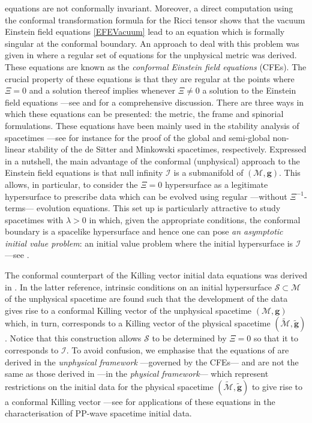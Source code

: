 \documentclass[10pt,a4paper]{article}
\theoremstyle{plain}
\def\bmg{{\bm g}}
\begin{document}
equations are not conformally invariant. Moreover, a direct
computation using the conformal transformation formula for the Ricci
tensor shows that the vacuum Einstein field equations
\eqref{EFEVacuum} lead to an equation which is formally singular at
the conformal boundary.  An approach to deal with this problem was
given in \cite{Fri81a} where a regular set of equations for the
unphysical metric was derived. These equations are known as the
\emph{conformal Einstein field equations} (CFEs).  The crucial
property of these equations is that they are regular at the points
where $\Xi=0$ and a solution thereof implies whenever $\Xi\neq 0$ a
solution to the Einstein field equations ---see \cite{Fri81a,Fri83}
and \cite{CFEbook} for a comprehensive discussion.  There are three
ways in which these equations can be presented: the metric, the frame
and spinorial formulations. These equations have been mainly used in
the stability analysis of spacetimes ---see for instance \cite{Fri86b,
  Fri86c} for the proof of the global and semi-global non-linear
stability of the de Sitter and Minkowski spacetimes, respectively.
Expressed in a nutshell, the main advantage of the conformal
(unphysical) approach to the Einstein field equations is that null
infinity $\mathscr{I}$ is a submanifold of $(\mathcal{M},\bmg)$.  This
allows, in particular, to consider the $\Xi=0$ hypersurface as a
legitimate hypersurface to prescribe data which can be evolved using
regular ---without $\Xi^{-1}$-terms--- evolution equations.  This set
up is particularly attractive to study spacetimes with $\lambda>0$ in
which, given the appropriate conditions, the conformal boundary is a
spacelike hypersurface and hence one can pose \emph{an asymptotic
initial value problem}: an initial value problem where the initial
hypersurface is $\mathscr{I}$ ---see \cite{GasVal17,MarPaeSenSim16,
  LueVal09}.

\medskip

The conformal counterpart of the Killing vector initial data equations
\cite{BeiChr97b} was derived in \cite{Pae14a}.  In the latter
reference, intrinsic conditions on an initial hypersurface
$\mathcal{S}\subset \mathcal{M}$ of the unphysical spacetime are found
such that the development of the data gives rise to a conformal
Killing vector of the unphysical spacetime $(\mathcal{M},\bmg)$ which,
in turn, corresponds to a Killing vector of the physical spacetime
$(\tilde{\mathcal{M}},\tilde{\bmg})$.  Notice that this construction
allows $\mathcal{S}$ to be determined by $\Xi=0$ so that it to
corresponds to $\mathscr{I}$.  To avoid confusion, we emphasise that
the equations of \cite{Pae14a} are derived in the \emph{unphysical
framework} ---governed by the CFEs--- and are not the same as those
derived in \cite{GarKha19} ---in the \emph{physical framework}---
which represent restrictions on the initial data for the physical
spacetime $(\tilde{\mathcal{M}},\tilde{\bmg})$ to give rise to a
conformal Killing vector ---see \cite{Gar22} for applications of these
equations in the characterisation of PP-wave spacetime initial data.
\end{document}
